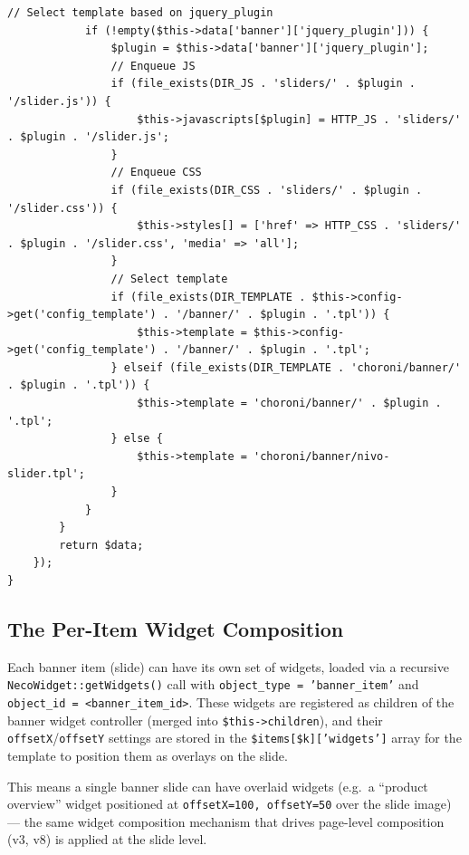 \documentclass[11pt,a4paper]{article}
\begin{document}
\begin{lstlisting}[caption={\texttt{ControllerModuleBanner::init()} --- the module:settings filter (abridged).},label={lst:banner-widget}]
            // Select template based on jquery_plugin
            if (!empty($this->data['banner']['jquery_plugin'])) {
                $plugin = $this->data['banner']['jquery_plugin'];
                // Enqueue JS
                if (file_exists(DIR_JS . 'sliders/' . $plugin . '/slider.js')) {
                    $this->javascripts[$plugin] = HTTP_JS . 'sliders/' . $plugin . '/slider.js';
                }
                // Enqueue CSS
                if (file_exists(DIR_CSS . 'sliders/' . $plugin . '/slider.css')) {
                    $this->styles[] = ['href' => HTTP_CSS . 'sliders/' . $plugin . '/slider.css', 'media' => 'all'];
                }
                // Select template
                if (file_exists(DIR_TEMPLATE . $this->config->get('config_template') . '/banner/' . $plugin . '.tpl')) {
                    $this->template = $this->config->get('config_template') . '/banner/' . $plugin . '.tpl';
                } elseif (file_exists(DIR_TEMPLATE . 'choroni/banner/' . $plugin . '.tpl')) {
                    $this->template = 'choroni/banner/' . $plugin . '.tpl';
                } else {
                    $this->template = 'choroni/banner/nivo-slider.tpl';
                }
            }
        }
        return $data;
    });
}
\end{lstlisting}

\subsection{The Per-Item Widget Composition}

\begin{findingbox}
Each banner item (slide) can have its own set of widgets, loaded via a
recursive \texttt{NecoWidget::getWidgets()} call with
\texttt{object\_type = 'banner\_item'} and
\texttt{object\_id = <banner\_item\_id>}. These widgets are registered
as children of the banner widget controller (merged into
\texttt{\$this->children}), and their \texttt{offsetX}/\texttt{offsetY}
settings are stored in the \texttt{\$items[\$k]['widgets']} array for
the template to position them as overlays on the slide.

This means a single banner slide can have overlaid widgets (e.g.\ a
``product overview'' widget positioned at \texttt{offsetX=100,
offsetY=50} over the slide image) --- the same widget composition
mechanism that drives page-level composition (v3, v8) is applied at
the slide level.
\end{findingbox}
\end{document}
